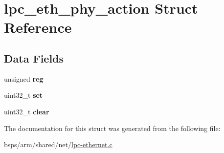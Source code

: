 \hypertarget{structlpc__eth__phy__action}{}\section{lpc\+\_\+eth\+\_\+phy\+\_\+action Struct Reference}
\label{structlpc__eth__phy__action}
\subsection*{Data Fields}
\begin{DoxyCompactItemize}
\item 
\mbox{\label{structlpc__eth__phy__action_ac6526abe040c244e9a2163d1522df93b}} 
unsigned {\bfseries reg}
\item 
\mbox{\label{structlpc__eth__phy__action_a94bf64c732d3981b215e655c6a3ab4e8}} 
uint32\+\_\+t {\bfseries set}
\item 
\mbox{\label{structlpc__eth__phy__action_a90dd287495455bc2cd0fd6a59b1e21a7}} 
uint32\+\_\+t {\bfseries clear}
\end{DoxyCompactItemize}


The documentation for this struct was generated from the following file\+:\begin{DoxyCompactItemize}
\item 
bsps/arm/shared/net/\mbox{\hyperlink{lpc-ethernet_8c}{lpc-\/ethernet.\+c}}\end{DoxyCompactItemize}
